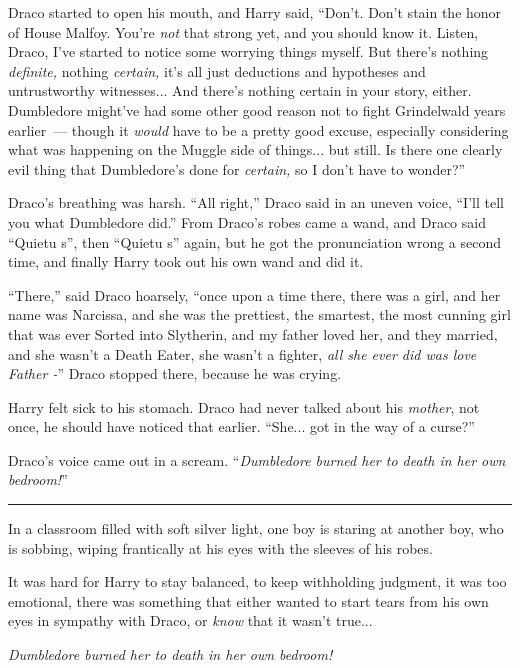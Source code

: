 Draco started to open his mouth, and Harry said, ``Don't. Don't stain the honor of House Malfoy. You're \emph{not} that strong yet, and you should know it. Listen, Draco, I've started to notice some worrying things myself. But there's nothing \emph{definite,} nothing \emph{certain,} it's all just deductions and hypotheses and untrustworthy witnesses... And there's nothing certain in your story, either. Dumbledore might've had some other good reason not to fight Grindelwald years earlier~--- though it \emph{would} have to be a pretty good excuse, especially considering what was happening on the Muggle side of things... but still. Is there one clearly evil thing that Dumbledore's done for \emph{certain,} so I don't have to wonder?''

Draco's breathing was harsh. ``All right,'' Draco said in an uneven voice, ``I'll tell you what Dumbledore did.'' From Draco's robes came a wand, and Draco said ``Quietu s'', then ``Quietu s'' again, but he got the pronunciation wrong a second time, and finally Harry took out his own wand and did it.

``There,'' said Draco hoarsely, ``once upon a time there, there was a girl, and her name was Narcissa, and she was the prettiest, the smartest, the most cunning girl that was ever Sorted into Slytherin, and my father loved her, and they married, and she wasn't a Death Eater, she wasn't a fighter, \emph{all she ever did was love Father -}'' Draco stopped there, because he was crying.

Harry felt sick to his stomach. Draco had never talked about his \emph{mother}, not once, he should have noticed that earlier. ``She... got in the way of a curse?''

Draco's voice came out in a scream. ``\emph{Dumbledore burned her to death in her own bedroom!}''

\begin{center}\rule{3in}{0.4pt}\end{center}

In a classroom filled with soft silver light, one boy is staring at another boy, who is sobbing, wiping frantically at his eyes with the sleeves of his robes.

It was hard for Harry to stay balanced, to keep withholding judgment, it was too emotional, there was something that either wanted to start tears from his own eyes in sympathy with Draco, or \emph{know} that it wasn't true...

\emph{Dumbledore burned her to death in her own bedroom!}

